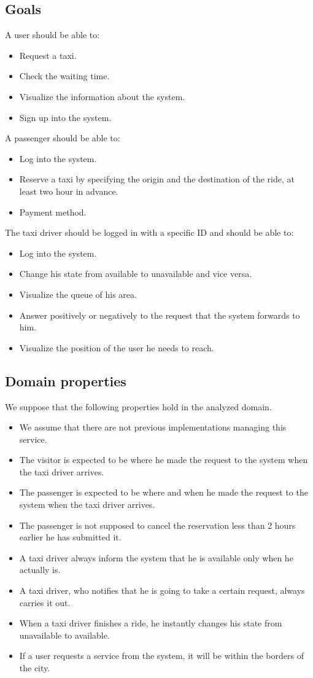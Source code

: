 \documentclass[18pt,oneside,a4paper, titlepage]{article}
\begin{document}
	\subsection{Goals}
	A user should be able to:
	\begin{itemize}
		\item Request a taxi.
		\item Check the waiting time.
		\item Visualize the information about the system.
		\item Sign up into the system.
	\end{itemize}
	A passenger should be able to:
	\begin{itemize}
		\item Log into the system.
		\item Reserve a taxi by specifying the origin and the destination of the ride, at least two hour in advance.
		\item Payment method.
	\end{itemize}
	The taxi driver should be logged in with a specific ID and should be able to:
	\begin{itemize}
		\item Log into the system.
		\item Change his state from available to unavailable and vice versa.
		\item Visualize the queue of his area.
		\item Answer positively or negatively to the request that the system forwards to him.
		\item Visualize the position of the user he needs to reach.
	\end{itemize}

	\subsection{Domain properties}
	We suppose that the following properties hold in the analyzed domain.
	\begin{itemize}
		\item We assume that there are not previous implementations managing this service.
		\item The visitor is expected to be where he made the request to the system when the taxi driver arrives.
		\item The passenger is expected to be where and when he made the request to the system when the taxi driver arrives.
		\item The passenger is not supposed to cancel the reservation less than 2 hours earlier he has submitted it.
		\item A taxi driver always inform the system that he is available only when he actually is.
		\item A taxi driver, who notifies that he is going to take a certain request, always carries it out.
		\item When a taxi driver finishes a ride, he instantly changes his state from unavailable to available.
		\item If a user requests a service from the system, it will be within the borders of the city.
		
	\end{itemize}
\end{document}
